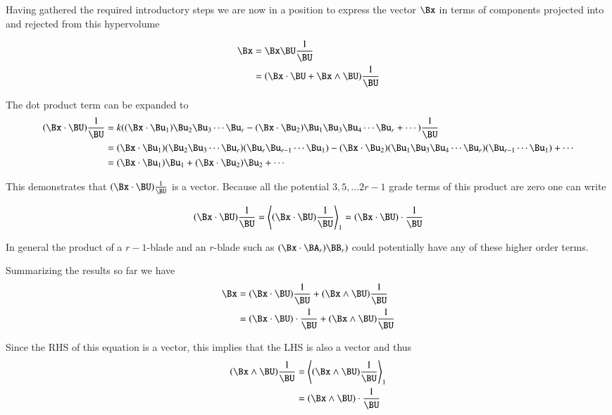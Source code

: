 Having gathered the required introductory steps we are now in a position to express the vector $\Bx$ in terms
of components projected into and rejected from this hypervolume

\begin{align*}
\Bx &= \Bx \BU \frac{1}{\BU} \\
    &= (\Bx \cdot \BU + \Bx \wedge \BU)\frac{1}{\BU} \\
\end{align*}

The dot product term can be expanded to
\begin{align*}
(\Bx \cdot \BU) \frac{1}{\BU} 
&= k(
      (\Bx \cdot \Bu_1)\Bu_2\Bu_3\cdots\Bu_r
    - (\Bx \cdot \Bu_2)\Bu_1\Bu_3\Bu_4\cdots\Bu_r
    + \cdots
    ) \frac{1}{\BU} \\
&= 
  (\Bx \cdot \Bu_1)(\Bu_2\Bu_3\cdots\Bu_r)(\Bu_r\Bu_{r-1}\cdots\Bu_1)
- (\Bx \cdot \Bu_2)(\Bu_1\Bu_3\Bu_4\cdots\Bu_r)(\Bu_{r-1}\cdots\Bu_1)
+ \cdots \\
&= 
  (\Bx \cdot \Bu_1)\Bu_1
+ (\Bx \cdot \Bu_2)\Bu_2
+ \cdots \\
\end{align*}

This demonstrates that $(\Bx \cdot \BU) \frac{1}{\BU}$ is a vector.  Because all the potential $3, 5, ... 2r-1$ grade terms of this product are zero one can write

\[
(\Bx \cdot \BU) \frac{1}{\BU} = \left<(\Bx \cdot \BU) \frac{1}{\BU}\right>_1 = (\Bx \cdot \BU) \cdot \frac{1}{\BU}
\]

In general the product of a $r-1$-blade and an $r$-blade such as $(\Bx \cdot \BA_r)\BB_r)$ could potentially have any of these higher order terms.

Summarizing the results so far we have
\begin{align*}
\Bx
&= (\Bx \cdot \BU)\frac{1}{\BU} + (\Bx \wedge \BU)\frac{1}{\BU} \\
&= (\Bx \cdot \BU) \cdot \frac{1}{\BU} + (\Bx \wedge \BU)\frac{1}{\BU} \\
\end{align*}

Since the RHS of this equation is a vector, this implies that the LHS is also a vector and thus
\begin{align*}
(\Bx \wedge \BU)\frac{1}{\BU} 
&= \left<(\Bx \wedge \BU)\frac{1}{\BU}\right>_1 \\
&= (\Bx \wedge \BU) \cdot \frac{1}{\BU} \\
\end{align*}


